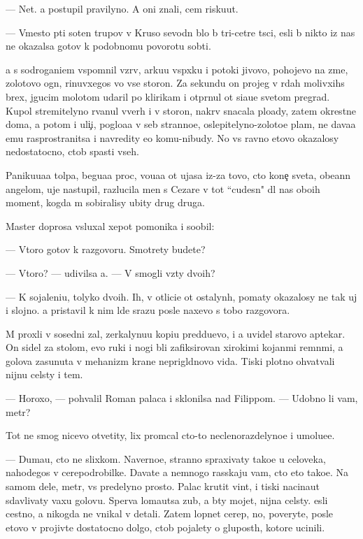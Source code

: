 \documentclass[10pt]{book}
\begin{document}
— Net. {\Y}a postupil pravilyno. A oni znali, cem risku{\y}ut.

— Vmesto p{\ia}ti soten trupov v Kruso sevodn{\ia} b{\yi}lo b{\yi} tri-cet{\yi}re t{\yi}s{\ia}ci, {\y}esli b{\yi} nikto iz nas ne okazalsa gotov k podobnomu povorotu sob{\yi}ti{\y}.

{\Y}a s sodrogani{\y}em vspomnil vzr{\yi}v, {\y}arku{\y}u vsp{\yi}xku i potoki jivovo, pohojevo na zme{\y}, zolotovo ogn{\ia}, rinuvxegos{\ia} vo vse storon{\yi}. Za sekundu on projeg v r{\ia}dah molivxihs{\ia} brex, jgucim molotom udaril po klirikam i otpr{\ia}nul ot si{\y}a{\y}u{\x}e{\y} svetom pregrad{\yi}. Kupol stremitelyno rvanul vverh i v storon{\yi}, nakr{\yi}v snacala plo{\x}ady, zatem okrestn{\yi}{\y}e doma, a potom i uli{\c}i, poglo{\x}a{\y}a v seb{\ia} stranno{\y}e, oslepitelyno-zoloto{\y}e plam{\ia}, ne dava{\y}a {\y}emu rasprostranitsa i navredity {\y}e{\x}o komu-nibudy. No vs{\e} ravno etovo okazalosy nedostatocno, ctob{\yi} spasti vseh.

Paniku{\y}u{\x}a{\y}a tolpa, begu{\x}a{\y}a proc, vo{\y}u{\x}a{\y}a ot ujasa iz-za tovo, cto kone{\c} sveta, obe{\x}ann{\yi}{\y} angelom, uje nastupil, razlucila men{\ia} s Cezare v tot ``cudesn{\yi}{\y}" dl{\ia} nas obo{\y}ih moment, kogda m{\yi} sobiralisy ubity drug druga.

Master doprosa v{\yi}sluxal xepot pomo{\x}nika i soob{\x}il:

— Vtoro{\y} gotov k razgovoru. Smotrety budete?

— Vtoro{\y}? — udivilsa {\y}a. — V{\yi} smogli vz{\ia}ty dvo{\y}ih?

— K sojaleni{\y}u, tolyko dvo{\y}ih. Ih, v otlici{\y}e ot ostalyn{\yi}h, po{\y}maty okazalosy ne tak uj i slojno. {\Y}a pristavil k nim l{\iu}de{\y} srazu posle naxevo s tobo{\y} razgovora.

M{\yi} proxli v sosedni{\y} zal, zerkalynu{\y}u kopi{\y}u pred{\yi}du{\x}evo, i {\y}a uvidel starovo aptekar{\ia}. On sidel za stolom, {\y}evo ruki i nogi b{\yi}li zafiksirovan{\yi} xirokimi kojan{\yi}mi remn{\ia}mi, a golova zasunuta v mehanizm kra{\y}ne neprigl{\ia}dnovo vida. Tiski plotno ohvat{\yi}vali nijn{\iu}{\y}u cel{\iu}sty i tem{\ia}.

— Horoxo, — pohvalil Roman palaca i sklonilsa nad Filippom. — Udobno li vam, metr?

Tot ne smog nicevo otvetity, lix prom{\yi}cal cto-to neclenorazdelyno{\y}e i umol{\ia}{\y}u{\x}e{\y}e.

— Duma{\y}u, cto ne slixkom. Naverno{\y}e, stranno spraxivaty tako{\y}e u celoveka, nahod{\ia}{\x}egos{\ia} v cerepodrobilke. Dava{\y}te {\y}a nemnogo rasskaju vam, cto eto tako{\y}e. Na samom dele, metr, vs{\e} predelyno prosto. Palac krutit vint, i tiski nacina{\y}ut sdavlivaty vaxu golovu. Sperva loma{\y}utsa zub{\yi}, a b{\yi}ty mojet, nijn{\ia}{\y}a cel{\iu}sty. {\Y}esli cestno, {\y}a nikogda ne vnikal v detali. Zatem lopnet cerep, no, poveryte, posle etovo v{\yi} projiv{\e}te dostatocno dolgo, ctob{\yi} pojalety o glupost{\ia}h, kotor{\yi}{\y}e ucinili.
\end{document}
